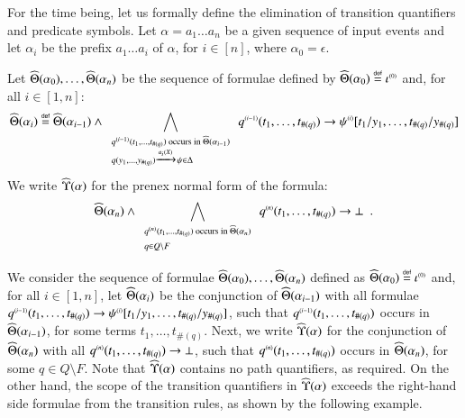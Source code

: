 For the time being, let us formally define the elimination of
transition quantifiers and predicate symbols. Let $\alpha = a_1 \ldots
a_n$ be a given sequence of input events and let $\alpha_i$ be the
prefix $a_1 \ldots a_i$ of $\alpha$, for $i \in [n]$, where
$\alpha_0=\epsilon$.
\ifLongVersion
\begin{definition}\label{def:quantform}
  Let $\widehat{\Theta}({\alpha_0}), \ldots, \widehat{\Theta}({\alpha_n})$ be the
  sequence of formulae defined by $\widehat{\Theta}({\alpha_0}) \stackrel{\scriptscriptstyle{\mathsf{def}}}{=}
  {\iota}^{\scriptscriptstyle{({0})}}$ and, for all $i \in [1,n]$:
  \[\widehat{\Theta}({\alpha_i}) \stackrel{\scriptscriptstyle{\mathsf{def}}}{=} \widehat{\Theta}({\alpha_{i-1}}) \wedge
  \bigwedge_{\begin{array}{l}
      \scriptstyle{{q}^{\scriptscriptstyle{({i-1})}}(t_1,\ldots,t_{\#(q)}) \text{ occurs in } \widehat{\Theta}({\alpha_{i-1}})} \\
      \scriptstyle{q(y_1,\ldots,y_{\#(q)}) \xrightarrow{{\scriptscriptstyle a_i(X)}}_{{\scriptstyle }} \psi \in \Delta} 
  \end{array}} {q}^{\scriptscriptstyle{({i-1})}}(t_1,\ldots,t_{\#(q)}) \rightarrow 
    {\psi}^{\scriptscriptstyle{({i})}}[t_1/y_1, \ldots, t_{\#(q)}/y_{\#(q)}]
      \]  
      We write
    $\widehat{\Upsilon}({\alpha})$ for the prenex normal form of the formula: 
      \[\widehat{\Theta}({\alpha_n}) \wedge \bigwedge_{\begin{array}{l}
          \scriptstyle{{q}^{\scriptscriptstyle{({n})}}(t_1,\ldots,t_{\#(q)}) \text{ occurs in } \widehat{\Theta}({\alpha_n})} \\
          \scriptstyle{q \in Q \setminus F}
      \end{array}} {q}^{\scriptscriptstyle{({n})}}(t_1,\ldots,t_{\#(q)}) \rightarrow \bot \enspace.\]
\end{definition}
\else
We consider the sequence of formulae $\widehat{\Theta}({\alpha_0}), \ldots,
\widehat{\Theta}({\alpha_n})$ defined as $\widehat{\Theta}({\alpha_0}) \stackrel{\scriptscriptstyle{\mathsf{def}}}{=}
{\iota}^{\scriptscriptstyle{({0})}}$ and, for all $i \in [1,n]$, let
$\widehat{\Theta}({\alpha_i})$ be the conjunction of
$\widehat{\Theta}({\alpha_{i-1}})$ with all formulae
${q}^{\scriptscriptstyle{({i-1})}}(t_1,\ldots,t_{\#(q)}) \rightarrow
{\psi}^{\scriptscriptstyle{({i})}}[t_1/y_1, \ldots, t_{\#(q)}/y_{\#(q)}]$, such that
${q}^{\scriptscriptstyle{({i-1})}}(t_1,\ldots,t_{\#(q)})$ occurs in
$\widehat{\Theta}({\alpha_{i-1}})$, for some terms
$t_1,\ldots,t_{\#(q)}$. Next, we write $\widehat{\Upsilon}({\alpha})$ for the
conjunction of $\widehat{\Theta}({\alpha_n})$ with all
${q}^{\scriptscriptstyle{({n})}}(t_1,\ldots,t_{\#(q)}) \rightarrow \bot$, such that
${q}^{\scriptscriptstyle{({n})}}(t_1,\ldots,t_{\#(q)})$ occurs in
$\widehat{\Theta}({\alpha_n})$, for some $q \in Q \setminus F$.
\fi
Note that $\widehat{\Upsilon}({\alpha})$ contains no path quantifiers, as
required. On the other hand, the scope of the transition quantifiers
in $\widehat{\Upsilon}({\alpha})$ exceeds the right-hand side formulae from the
transition rules, as shown by the following example.

